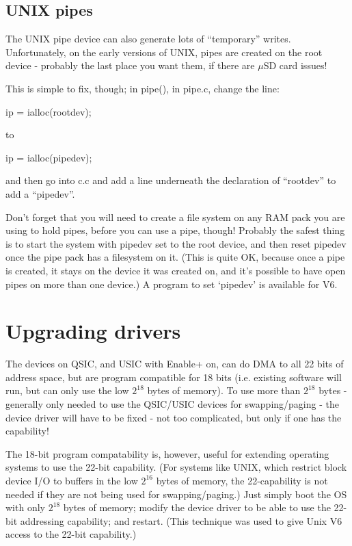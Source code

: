 \subsection{UNIX pipes}

The UNIX pipe device can also generate lots of ``temporary'' writes.
Unfortunately, on the early versions of UNIX, pipes are created on the root
device - probably the last place you want them, if there are $\mu$SD card issues!

This is simple to fix, though; in pipe(), in pipe.c, change the line:

	ip = ialloc(rootdev);

to

	ip = ialloc(pipedev);

and then go into c.c and add a line underneath the declaration of ``rootdev''
to add a ``pipedev''.

Don't forget that you will need to create a file system on any RAM pack you
are using to hold pipes, before you can use a pipe, though! Probably the
safest thing is to start the system with pipedev set to the root device, and
then reset pipedev once the pipe pack has a filesystem on it. (This is quite
OK, because once a pipe is created, it stays on the device it was created on,
and it's possible to have open pipes on more than one device.) A program to
set `pipedev' is available for V6.

\section{Upgrading drivers}

The devices on QSIC, and USIC with Enable+ on, can do DMA to all 22 bits of
address space, but are program compatible for 18 bits (i.e. existing software
will run, but can only use the low $2^{18}$ bytes of memory). To use more
than $2^{18}$ bytes - generally only needed to use the QSIC/USIC devices for
swapping/paging - the device driver will have to be fixed - not too
complicated, but only if one has the capability!

The 18-bit program compatability is, however, useful for extending operating
systems to use the 22-bit capability. (For systems like UNIX, which restrict
block device I/O to buffers in the low $2^{16}$ bytes of memory, the
22-capability is not needed if they are not being used for swapping/paging.)
Just simply boot the OS with only $2^{18}$ bytes of memory; modify the device
driver to be able to use the 22-bit addressing capability; and restart. (This
technique was used to give Unix V6 access to the 22-bit capability.)

